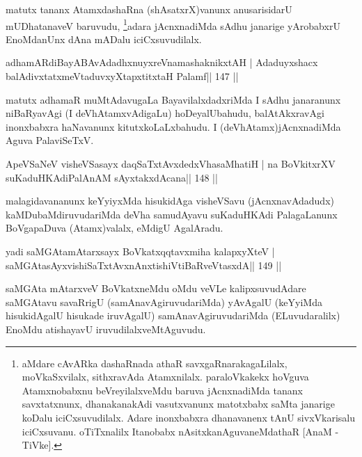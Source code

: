 \begin{artha}
matutx tananx AtamxdashaRna (shAsatxrX)vanunx anusarisidarU 
mUDhatanaveV baru\-vudu, \footnote[6]{aMdare cAvARka dashaRnada athaR 
savxgaRnarakagaLilalx, moVkaSxvilalx, sithxravAda Atamxnilalx. 
paraloVkakekx hoVguva Atamxnobabxnu beVreyilalxveMdu baruva 
jAcnxnadiMda tananx savxtatxnunx, dhanakanakAdi vasutxvanunx matotxbabx 
saMta janarige koDalu iciCxsuvudilalx. Adare inonxbabxra dhanavanenx 
tAnU sivxVkarisalu iciCxsuvanu. oTiTxnalilx Itanobabx nAsitxkanAguvaneMdathaR [AnaM - TiVke].}adara jAcnxnadiMda sAdhu janarige yArobabxrU EnoMdanUnx dAna mADalu iciCxsuvudilalx.
\end{artha}

\begin{shl}
adhamARdiBayABAvAdadhxnuyxreVnamashaknikxtAH |
Adaduyxshacx balAdivxtatxmeVtaduvxyXtapxtitxtaH Palamf\hfill || 147 ||
\end{shl}

\begin{artha}
matutx adhamaR muMtAdavugaLa BayavilalxdadxriMda I sAdhu janaranunx niBaRyavAgi (I deVhAtamxvAdigaLu) hoDeyalUbahudu, balAtAkxravAgi inonxbabxra haNavanunx kitutxkoLaLxbahudu. I (deVhAtamx)jAcnxnadiMda Aguva PalaviSeTxV.
\end{artha}


\begin{shl}
ApeVSaNeV visheVSasayx daqSaTxtAvxdedxVhasaMhatiH |
na BoVkitxrXV suKaduHKAdiPalAnAM sAyxtakxdAcana\hfill || 148 ||
\end{shl}

\begin{artha}
malagidavananunx keYyiyxMda hisukidAga visheVSavu (jAcnxnavAdadudx) kaMDu\-baMdiruvudariMda deVha samudAyavu suKaduHKAdi PalagaLanunx BoVgapaDuva (Atamx)valalx, eMdigU AgalAradu.
\end{artha}


\begin{shl}
yadi saMGAtamAtarxsayx BoVkatxqqtavxmiha kalapxyXteV |
saMGAtasAyxvishiSaTxtAvxnAnxtishiVtiBaRveVtasxdA\hfill || 149 ||
\end{shl}

\begin{artha}
saMGAta mAtarxveV BoVkatxneMdu oMdu veVLe kalipxsuvudAdare saMGAtavu 
savaRrigU (samAnavAgiruvudariMda) yAvAgalU (keYyiMda hisukidAgalU 
hisukade iruvAgalU) samAnavAgiruvudariMda (ELuvudaralilx) EnoMdu 
atishayavU iruvudilalxveMtAguvudu.
\end{artha}

